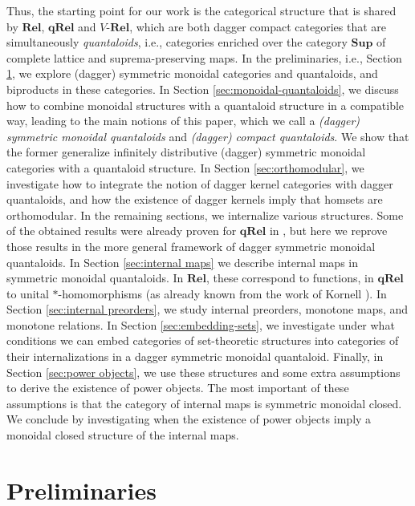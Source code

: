 \documentclass[12pt]{tac}
\theoremstyle{definition}
\theoremstyle{remark}
\newcommand{\<}{\langle}
\renewcommand{\>}{\rangle}
\renewcommand{\:}{\colon}
\begin{document}
Thus, the starting point for our work is the categorical structure that is shared by $\mathbf{Rel}$, $\mathbf{qRel}$ and $V$-$\mathbf{Rel}$, which are both dagger compact categories that are simultaneously \emph{quantaloids}, i.e., categories enriched over the category $\mathbf{Sup}$ of complete lattice and suprema-preserving maps. In the preliminaries, i.e., Section \ref{sec:preliminaries}, we explore (dagger) symmetric monoidal categories and quantaloids, and biproducts in these categories. In Section \ref{sec:monoidal-quantaloids}, we discuss how to combine monoidal structures with a quantaloid structure in a compatible way, leading to the main notions of this paper, which we call a \emph{ (dagger) symmetric monoidal quantaloids} and \emph{(dagger) compact quantaloids}. We show that the former generalize infinitely distributive (dagger) symmetric monoidal categories with a quantaloid structure. In Section \ref{sec:orthomodular}, we investigate how to integrate the notion of dagger kernel categories with dagger quantaloids, and how the existence of dagger kernels imply that homsets are orthomodular. In the remaining sections, we internalize various structures. Some of the obtained results were already proven for $\mathbf{qRel}$ in \cite{KLM20}, but here we reprove those results in the more general framework of dagger symmetric monoidal quantaloids. In Section \ref{sec:internal maps} we describe internal maps in symmetric monoidal quantaloids. In $\mathbf{Rel}$, these correspond to functions, in $\mathbf{qRel}$ to unital $*$-homomorphisms (as already known from the work of Kornell \cite{Kornell18}). In Section \ref{sec:internal preorders}, we study internal preorders, monotone maps, and monotone relations. In Section \ref{sec:embedding-sets}, we investigate under what conditions we can embed categories of set-theoretic structures into categories of their internalizations in a dagger symmetric monoidal quantaloid. Finally, in Section \ref{sec:power objects}, we use these structures and some extra assumptions to derive the existence of power objects. The most important of these assumptions is that the category of internal maps is symmetric monoidal closed. We conclude by investigating when the existence of power objects imply a monoidal closed structure of the internal maps. 







\section{Preliminaries}\label{sec:preliminaries}
\end{document}
